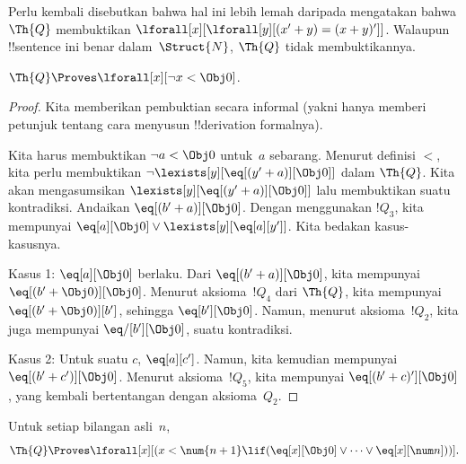 \documentclass[../../../include/open-logic-section]{subfiles}
\begin{document}
Perlu kembali disebutkan bahwa hal ini lebih lemah daripada mengatakan bahwa
$\Th{Q}$ membuktikan $\lforall[x][\lforall[y][(x' + y) = (x + y)']]$.
Walaupun !!{sentence} ini benar dalam~$\Struct{N}$, $\Th{Q}$ tidak
membuktikannya.

\begin{lem}
$\Th{Q} \Proves \lforall[x][\lnot x < \Obj 0]$.
\end{lem}

\begin{proof}
Kita memberikan pembuktian secara informal (yakni hanya memberi petunjuk
tentang cara menyusun !!{derivation} formalnya).

Kita harus membuktikan $\lnot a < \Obj 0$ untuk~$a$ sebarang. Menurut
definisi $<$, kita perlu membuktikan
$\lnot \lexists[y][\eq[(y'+a)][\Obj 0]]$ dalam $\Th{Q}$. Kita akan
mengasumsikan $\lexists[y][\eq[(y'+a)][\Obj 0]]$ lalu membuktikan suatu
kontradiksi. Andaikan $\eq[(b'+a)][\Obj 0]$. Dengan menggunakan $!Q_3$, kita
mempunyai $\eq[a][\Obj 0] \lor \lexists[y][\eq[a][y']]$. Kita bedakan
kasus-kasusnya.

Kasus 1: $\eq[a][\Obj 0]$ berlaku. Dari $\eq[(b'+a)][\Obj 0]$, kita
mempunyai $\eq[(b' + \Obj 0)][\Obj 0]$. Menurut aksioma~$!Q_4$ dari
$\Th{Q}$, kita mempunyai $\eq[(b' + \Obj 0)][b']$, sehingga
$\eq[b'][\Obj 0]$. Namun, menurut aksioma~$!Q_2$, kita juga mempunyai
$\eq/[b'][\Obj 0]$, suatu kontradiksi.

Kasus 2: Untuk suatu $c$, $\eq[a][c']$. Namun, kita kemudian mempunyai
$\eq[(b' + c')][\Obj 0]$. Menurut aksioma~$!Q_5$, kita mempunyai
$\eq[(b' + c)'][\Obj 0]$, yang kembali bertentangan dengan aksioma~$Q_2$.
\end{proof}

\begin{lem}
Untuk setiap bilangan asli~$n$,
  \[
  \Th{Q} \Proves
  \lforall[x][(x < \num {n+1} \lif (\eq[x][\Obj 0] \lor \dots \lor
    \eq[x][\num n]))].
  \]
\end{lem}
\end{document}
